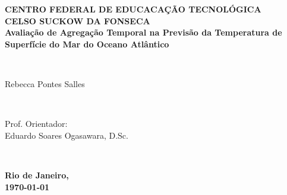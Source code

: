 \documentclass[12pt]{report} %
\begin{document}
	
	\thispagestyle{empty} %
	\center %
	
	\begin{minipage}{\textwidth}
		\begin{center}
			{\bfseries \large CENTRO FEDERAL DE EDUCACAÇÃO TECNOLÓGICA\\ CELSO SUCKOW DA FONSECA}\\[16em]
			{\bfseries \LARGE Avaliação de Agregação Temporal na Previsão da Temperatura de Superfície do Mar do Oceano Atlântico}
		\end{center}
	\end{minipage}\\[6em]
	
	\begin{flushright}
		\begin{minipage}{0.5\textwidth}
			\normalsize
			\raggedleft \normalsize Rebecca Pontes Salles
		\end{minipage}\\[6em]
	\end{flushright}
	
	\begin{flushright}
		\begin{minipage}{0.5\textwidth}
			\raggedleft
			Prof. Orientador:\\
			Eduardo Soares Ogasawara, D.Sc.
		\end{minipage}\\
	\end{flushright}
	\vfill	
	{\bfseries \large Rio de Janeiro,\\
		\today} %
	
	\pagebreak
	
	
	\thispagestyle{empty} %
	\center %
	
\end{document}

